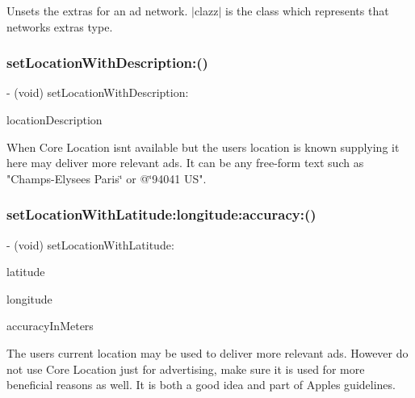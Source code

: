 Unsets the extras for an ad network. $\vert$clazz$\vert$ is the class which represents that network\textquotesingle{}s extras type. \mbox{\label{interfaceGADRequest_a80b906a01ff334f984f7ec6f70a2d10a}} 
\subsubsection{\texorpdfstring{set\+Location\+With\+Description\+:()}{setLocationWithDescription:()}}
{\footnotesize\ttfamily -\/ (void) set\+Location\+With\+Description\+: \begin{DoxyParamCaption}\item[{(N\+S\+String $\ast$)}]{location\+Description }\end{DoxyParamCaption}}

When Core Location isn\textquotesingle{}t available but the user\textquotesingle{}s location is known supplying it here may deliver more relevant ads. It can be any free-\/form text such as "Champs-\/\+Elysees Paris\char`\"{} or
@\char`\"{}94041 US". \mbox{\label{interfaceGADRequest_ad20cf8f7fabbbe2030e1f8277e5598f8}} 
\subsubsection{\texorpdfstring{set\+Location\+With\+Latitude\+:longitude\+:accuracy\+:()}{setLocationWithLatitude:longitude:accuracy:()}}
{\footnotesize\ttfamily -\/ (void) set\+Location\+With\+Latitude\+: \begin{DoxyParamCaption}\item[{(C\+G\+Float)}]{latitude }\item[{longitude:(C\+G\+Float)}]{longitude }\item[{accuracy:(C\+G\+Float)}]{accuracy\+In\+Meters }\end{DoxyParamCaption}}

The user\textquotesingle{}s current location may be used to deliver more relevant ads. However do not use Core Location just for advertising, make sure it is used for more beneficial reasons as well. It is both a good idea and part of Apple\textquotesingle{}s guidelines. \mbox{\label{interfaceGADRequest_aac5fa7bc678b1867b8815ca13f5b69a7}} 
